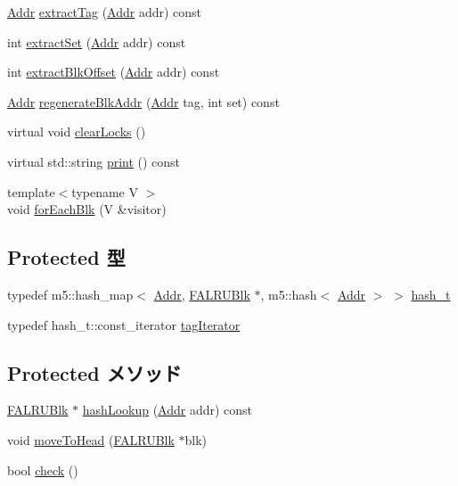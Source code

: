 \begin{DoxyCompactItemize}
\hyperlink{base_2types_8hh_af1bb03d6a4ee096394a6749f0a169232}{Addr} \hyperlink{classFALRU_a3a855eb5b0d8adbf737f25baa15a3d7b}{extractTag} (\hyperlink{base_2types_8hh_af1bb03d6a4ee096394a6749f0a169232}{Addr} addr) const 
\item 
int \hyperlink{classFALRU_a8fdcc1372cb0a5d8e1933bdb0bf7d680}{extractSet} (\hyperlink{base_2types_8hh_af1bb03d6a4ee096394a6749f0a169232}{Addr} addr) const 
\item 
int \hyperlink{classFALRU_aca82d98193a0685a9648acf6127abb1c}{extractBlkOffset} (\hyperlink{base_2types_8hh_af1bb03d6a4ee096394a6749f0a169232}{Addr} addr) const 
\item 
\hyperlink{base_2types_8hh_af1bb03d6a4ee096394a6749f0a169232}{Addr} \hyperlink{classFALRU_a6a30d516ca3dfb528b6e28e39b4744e8}{regenerateBlkAddr} (\hyperlink{base_2types_8hh_af1bb03d6a4ee096394a6749f0a169232}{Addr} tag, int set) const 
\item 
virtual void \hyperlink{classFALRU_a522e7dda9c2f4eba2cc1c103887d9265}{clearLocks} ()
\item 
virtual std::string \hyperlink{classFALRU_ac07d4bdf71f061cd9dba907c905a9543}{print} () const 
\item 
{\footnotesize template$<$typename V $>$ }\\void \hyperlink{classFALRU_a2f6fd1256bf2c210092c065ea65b83de}{forEachBlk} (V \&visitor)
\end{DoxyCompactItemize}
\subsection*{Protected 型}
\begin{DoxyCompactItemize}
\item 
typedef m5::hash\_\-map$<$ \hyperlink{base_2types_8hh_af1bb03d6a4ee096394a6749f0a169232}{Addr}, \hyperlink{classFALRUBlk}{FALRUBlk} $\ast$, m5::hash$<$ \hyperlink{base_2types_8hh_af1bb03d6a4ee096394a6749f0a169232}{Addr} $>$ $>$ \hyperlink{classFALRU_adac55c74efec4bdd54e5042924e5cd4d}{hash\_\-t}
\item 
typedef hash\_\-t::const\_\-iterator \hyperlink{classFALRU_a6b2dee7e09394d1cc2e986975c29fade}{tagIterator}
\end{DoxyCompactItemize}
\subsection*{Protected メソッド}
\begin{DoxyCompactItemize}
\item 
\hyperlink{classFALRUBlk}{FALRUBlk} $\ast$ \hyperlink{classFALRU_a55122befb6dfc11b5c81f04315531ee0}{hashLookup} (\hyperlink{base_2types_8hh_af1bb03d6a4ee096394a6749f0a169232}{Addr} addr) const 
\item 
void \hyperlink{classFALRU_a500e9f80634c062b4dbdd9c7e77565f8}{moveToHead} (\hyperlink{classFALRUBlk}{FALRUBlk} $\ast$blk)
\item 
bool \hyperlink{classFALRU_ae1ee541bb22588b6a71650c807efca90}{check} ()
\end{DoxyCompactItemize}
